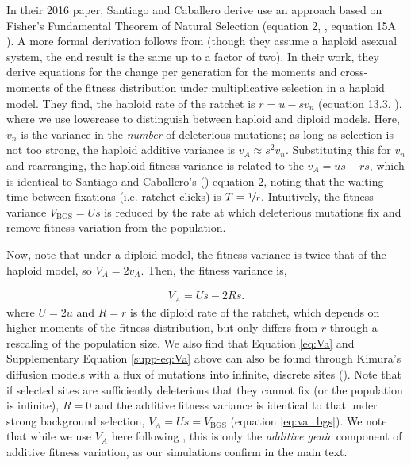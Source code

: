 \documentclass[11pt]{article}
\begin{document}
In their 2016 paper, Santiago and Caballero derive use an approach based on
Fisher's Fundamental Theorem of Natural Selection (equation 2,
\cite{Santiago2016-mu}, equation 15A \cite{Garcia-Dorado2007-jj}). A more
formal derivation follows from \textcite{Higgs1995-xc} (though they assume a
haploid asexual system, the end result is the same up to a factor of two). In
their work, they derive equations for the change per generation for the moments
and cross-moments of the fitness distribution under multiplicative selection in
a haploid model. They find, the haploid rate of the ratchet is $r = u - s v_n$
(equation 13.3, \cite{Higgs1995-xc}), where we use lowercase to distinguish
between haploid and diploid models. Here, $v_n$ is the variance in the
\emph{number} of deleterious mutations; as long as selection is not too strong,
the haploid additive variance is $v_{A} \approx s^2 v_n$. Substituting this for
$v_n$ and rearranging, the haploid fitness variance is related to the $v_A = us
- rs$, which is identical to Santiago and Caballero's
(\citeyear{Santiago2016-mu}) equation 2, noting that the waiting time between
fixations (i.e. ratchet clicks) is $T = \nicefrac{1}{r}$. Intuitively, the
fitness variance $V_\text{BGS} = Us$ is reduced by the rate at which
deleterious mutations fix and remove fitness variation from the population.

Now, note that under a diploid model, the fitness variance is twice that of the
haploid model, so $V_A = 2 v_A$. Then, the fitness variance is,

\begin{align}
  \label{supp-eq:Va}
  V_{A} = Us - 2Rs. 
\end{align}
%
where $U = 2u$ and $R=r$ is the diploid rate of the ratchet, which depends on
higher moments of the fitness distribution, but only differs from $r$ through a
rescaling of the population size. We also find that Equation \eqref{eq:Va} and
Supplementary Equation \ref{supp-eq:Va} above can also be found
through Kimura's diffusion models with a flux of mutations into infinite,
discrete sites (\citeyear{Kimura1969-jw}). Note that if selected sites are
sufficiently deleterious that they cannot fix (or the population is infinite),
$R=0$ and the additive fitness variance is identical to that under strong
background selection, $V_A = Us = V_\text{BGS}$ (equation \ref{eq:va_bgs}).
We note that while we use $V_A$ here following \textcite{Santiago2016-mu}, 
this is only the \emph{additive genic} component of additive fitness variation,
as our simulations confirm in the main text.
\end{document}
